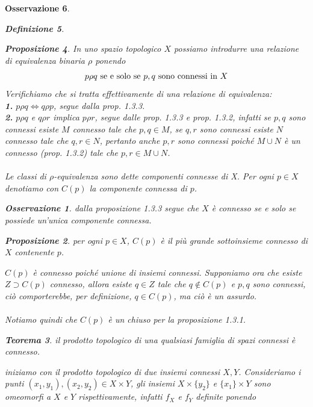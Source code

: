 \documentclass[oneside, 11pt]{amsbook}
\makeatletter
\newcommand{\0}{{(0)}}
\newcommand{\3}{{(3)}}
\theoremstyle{colonplain}
\newtheorem{thm}{Teorema}[chapter]
\newtheorem{prop}[thm]{Proposizione}
\theoremstyle{colondefinition}
\newtheorem{defn}[thm]{Definizione}
\theoremstyle{colonremark}
\newtheorem{rmk}[thm]{Osservazione}
\numberwithin{equation}{chapter}
\renewcommand{\proofname}{Dimostrazione}
\renewenvironment{proof}[1][\proofname]{\par
  \pushQED{\end{proof}}%
  \normalfont \topsep6\p@\@plus6\p@\relax
  \trivlist
  \item[\hskip\labelsep\bfseries #1:]\ignorespaces
}{%
  \popQED\endtrivlist\@endpefalse
}
\makeatother
\begin{document}
\begin{rmk}
\begin{defn}
\begin{prop}
In uno spazio topologico $X$ possiamo introdurre una relazione di equivalenza binaria $\rho$ ponendo
\begin{align}
    p \rho q \text{ se e solo se } p,q \text{ sono connessi in } X \notag
\end{align}
Verifichiamo che si tratta effettivamente di una relazione di equivalenza: \\
\textbf{1.} $p \rho q \iff q \rho p$, segue dalla \textit{prop. 1.3.3}. \\
\textbf{2.} $p \rho q$ e $q \rho r$ implica $p \rho r$, segue dalle \textit{prop. 1.3.3} e \textit{prop. 1.3.2}, infatti se $p, q$ sono connessi esiste $M$ connesso tale che $p, q \in M$, se $q, r$ sono connessi esiste $N$ connesso tale che $q, r \in N$, pertanto anche $p, r$ sono connessi poiché $M \cup N$ è un connesso (\textit{prop. 1.3.2}) tale che $p, r \in M \cup N$. \\ \\
Le classi di $\rho$\textit{-equivalenza} sono dette componenti connesse di X. Per ogni $p \in X$ denotiamo con $C(p)$ la \textit{componente connessa di} $p$.
\begin{rmk}
dalla \textit{proposizione 1.3.3} segue che $X$ è connesso se e solo se possiede un'unica componente connessa.
\end{rmk}
\begin{prop}
per ogni $p \in X$, $C(p)$ è il più grande sottoinsieme connesso di $X$ contenente $p$.
\end{prop}
\begin{proof}
$C(p)$ è connesso poiché unione di insiemi connessi. Supponiamo ora che esiste $Z \supset C(p)$ connesso, allora esiste $q \in Z$ tale che $q \not\in C(p)$ e $p, q$ sono connessi, ciò comporterebbe, per definizione, $q \in C(p)$, ma ciò è un assurdo. \\ \\
Notiamo quindi che $C(p)$ è un chiuso per la \textit{proposizione 1.3.1}.
\end{proof}
\begin{thm}
il prodotto topologico di una qualsiasi famiglia di spazi connessi è connesso.
\end{thm}
\begin{proof}
iniziamo con il prodotto topologico di due insiemi connessi $X, Y$. Consideriamo i punti $(x_1, y_1), (x_2, y_2) \in X \times Y$, gli insiemi $X \times \{ y_2 \}$ e $\{ x_1 \} \times Y$ sono omeomorfi a $X$ e $Y$ rispettivamente, infatti $f_X$ e $f_Y$ definite ponendo
\begin{align}

\end{align}
\end{proof}
\end{prop}
\end{defn}
\end{rmk}
\end{document}
